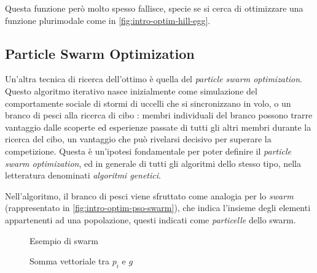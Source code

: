 Questa funzione però molto spesso fallisce, specie se si cerca di ottimizzare una funzione plurimodale come in \autoref{fig:intro-optim-hill-egg}.

\subsection{Particle Swarm Optimization}
\label{chap:intro-optim-pso}
Un'altra tecnica di ricerca dell'ottimo è quella del \textit{particle swarm optimization}. Questo algoritmo iterativo nasce inizialmente come simulazione del comportamente sociale di stormi di uccelli che si sincronizzano in volo, o un branco di pesci alla ricerca di cibo \cite{pso}: membri individuali del branco possono trarre vantaggio dalle scoperte ed esperienze passate di tutti gli altri membri durante la ricerca del cibo, un vantaggio che può rivelarsi decisivo per superare la competizione. Questa è un'ipotesi fondamentale per poter definire il \textit{particle swarm optimization}, ed in generale di tutti gli algoritmi dello stesso tipo, nella letteratura denominati \textit{algoritmi genetici}.

Nell'algoritmo, il branco di pesci viene sfruttato come analogia per lo \textit{swarm} (rappresentato in \autoref{fig:intro-optim-pso-swarm}), che indica l'insieme degli elementi appartenenti ad una popolazione, questi indicati come \textit{particelle} dello swarm.

\begin{figure}[!h]
    \begin{minipage}{0.5 \textwidth}
        \centering
        \caption{\small Esempio di swarm}
        \label{fig:intro-optim-pso-swarm}
    \end{minipage}
    \begin{minipage}{0.5 \textwidth}
        \centering
        \caption{\small Somma vettoriale tra $p_i$ e $g$}
        \label{fig:intro-optim-pso-sum}
    \end{minipage}
\end{figure}

